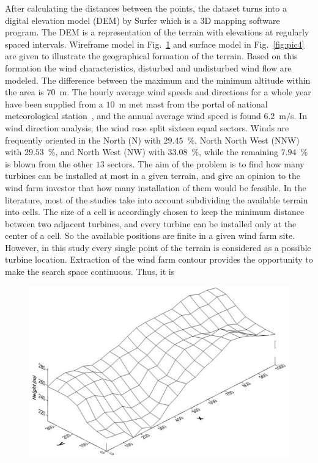 \documentclass[]{iptconf}
\begin{document}
After calculating the distances between the points, the dataset turns into a digital
elevation model (DEM) by Surfer which is a $3$D mapping software program.
The DEM is a representation of the terrain with elevations at regularly spaced
intervals. Wireframe model in Fig.~\ref{fig:pic3} and surface model in Fig.~\ref{fig:pic4} are given to
illustrate the geographical formation of the terrain. Based on this formation the wind
characteristics, disturbed and undisturbed wind flow are modeled. The difference
between the maximum and the minimum altitude within the area is $70$~m. The hourly
average wind speeds and directions for a whole year have been supplied from a $10$~m
met mast from the portal of national meteorological station~\cite{Meteoroloji2016}, and the annual
average wind speed is found $6.2$~m$/$s. In wind direction analysis, the wind rose split
sixteen equal sectors. Winds are frequently oriented in the North (N) with $29.45$~\%,
North North West (NNW) with $29.53$~\%, and North West (NW) with $33.08$~\%, while
the remaining $7.94$~\% is blown from the other $13$ sectors.
The aim of the problem is to find how many turbines can be installed at most
in a given terrain, and give an opinion to the wind farm investor that how many
installation of them would be feasible. In the literature, most of the studies take into
account subdividing the available terrain into cells. The size of a cell is accordingly
chosen to keep the minimum distance between two adjacent turbines, and every
turbine can be installed only at the center of a cell. So the available positions are
finite in a given wind farm site. However, in this study every single point of the
terrain is considered as a possible turbine location. Extraction of the wind farm
contour provides the opportunity to make the search space continuous. Thus, it is
\begin{figure}[h!]
	\centering
	\includegraphics[width=0.9\columnwidth]{Pictures/3D wireframe model of wind farm site.png}
	\label{fig:pic3}
\end{figure}
\end{document}
